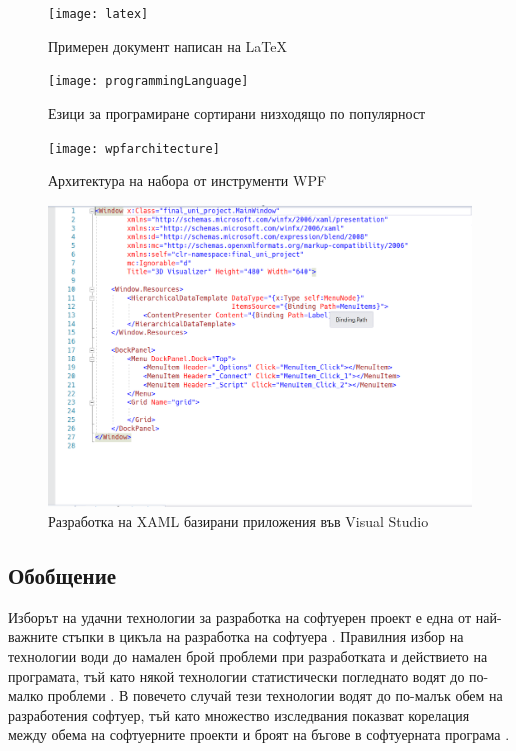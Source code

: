 \begin{figure}
 \centering
    \centerline{\texttt{[image: latex]}}
    \caption{Примерен документ написан на LaTeX}
    \label{fig:latexDoc}
\end{figure}

\begin{figure}
    \centering
    \centerline{\texttt{[image: programmingLanguage]}}
    \caption{Езици за програмиране сортирани низходящо по популярност}
    \label{fig:prog}
\end{figure}


\begin{figure}
    \centering
    \centerline{\texttt{[image: wpfarchitecture]}}
    \caption{Архитектура на набора от инструменти WPF}
    \label{fig:wpf}
\end{figure}

\begin{figure}
    \centering
    \centerline{\includegraphics{xaml}}
    \caption{Разработка на XAML базирани приложения във Visual Studio}
    \label{vsXaml}
\end{figure}



\subsection{Обобщение}
Изборът на удачни технологии за разработка на софтуерен проект е една от най-важните стъпки в цикъла на разработка на софтуера \cite{technologiesImportance}. Правилния избор на технологии води до намален брой проблеми при разработката и действието на програмата, тъй като някой технологии статистически погледнато водят до по-малко проблеми \cite{langResearch}. В повечето случай тези технологии водят до по-малък обем на разработения софтуер, тъй като множество изследвания показват корелация между обема на софтуерните проекти и броят на бъгове в софтуерната програма \cite{bugsToLength}.